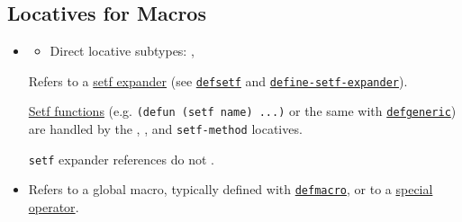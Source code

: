 \subsection{Locatives for Macros}\label{locatives-for-macros}

\label{x-28DREF-3A-40MACROLIKE-LOCATIVES-20MGL-PAX-3ASECTION-29}

\begin{itemize}
\item
  \label{x-28SETF-20MGL-PAX-3ALOCATIVE-29}

  \begin{itemize}
  \tightlist
  \item
    Direct locative subtypes:
    ,
  \end{itemize}

  Refers to a
  \href{http://www.lispworks.com/documentation/HyperSpec/Body/26_glo_s.htm\#setf_expander}{setf
  expander} (see
  \href{http://www.lispworks.com/documentation/HyperSpec/Body/m_defset.htm}{\texttt{defsetf}}
  and
  \href{http://www.lispworks.com/documentation/HyperSpec/Body/m_defi_3.htm}{\texttt{define-setf-expander}}).

  \href{http://www.lispworks.com/documentation/HyperSpec/Body/26_glo_s.htm\#setf_function}{Setf
  functions} (e.g. \texttt{(defun\ (setf\ name)\ ...)} or the same with
  \href{http://www.lispworks.com/documentation/HyperSpec/Body/m_defgen.htm}{\texttt{defgeneric}})
  are handled by the
  ,
  ,
  and \texttt{setf-method} locatives.

  \texttt{setf} expander references do not
  .
\item
  \label{x-28MGL-PAX-3AMACRO-20MGL-PAX-3ALOCATIVE-29}

  Refers to a global macro, typically defined with
  \href{http://www.lispworks.com/documentation/HyperSpec/Body/m_defmac.htm}{\texttt{defmacro}},
  or to a
  \href{http://www.lispworks.com/documentation/HyperSpec/Body/f_specia.htm}{special
  operator}.


\end{itemize}
